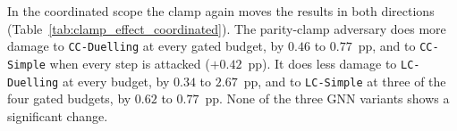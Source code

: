 In the coordinated scope the clamp again moves the results in both directions
(Table~\ref{tab:clamp_effect_coordinated}). The parity-clamp adversary does more damage
to \texttt{CC-Duelling} at every gated budget, by $0.46$ to $0.77$~pp, and to
\texttt{CC-Simple} when every step is attacked ($+0.42$~pp). It does less damage to
\texttt{LC-Duelling} at every budget, by $0.34$ to $2.67$~pp, and to \texttt{LC-Simple}
at three of the four gated budgets, by $0.62$ to $0.77$~pp. None of the three GNN
variants shows a significant change.


